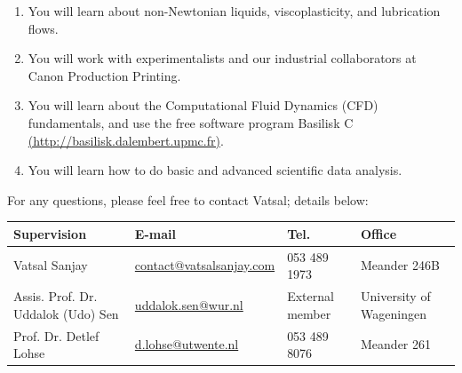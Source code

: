 \documentclass[a4paper,10pt]{article}
\begin{document}
\begin{enumerate}
\item You will learn about non-Newtonian liquids, viscoplasticity, and lubrication flows. 
\item You will work with experimentalists and our industrial collaborators at Canon Production Printing. 
\item You will learn about the Computational Fluid Dynamics (CFD) fundamentals, and use the free software program Basilisk C \href{http://basilisk.dalembert.upmc.fr}{(http://basilisk.dalembert.upmc.fr)}.
\item You will learn how to do basic and advanced scientific data analysis.
\end{enumerate}
For any questions, please feel free to contact Vatsal; details below: 

\begin{center}
\begin{tabular}{|l|l|l|l|}
\hline \textbf{Supervision} & \textbf{E-mail} & \textbf{Tel.} & \textbf{Office} \\ 
\hline Vatsal Sanjay & \href{mailto:contact@vatsalsanjay.com}{contact@vatsalsanjay.com} & 053 489 1973 & Meander 246B \\ 
\hline Assis. Prof. Dr. Uddalok (Udo) Sen & \href{mailto:uddalok.sen@wur.nl }{uddalok.sen@wur.nl} & External member & University of Wageningen \\ 
\hline Prof. Dr. Detlef Lohse & \href{mailto:d.lohse@utwente.nl}{d.lohse@utwente.nl} & 053 489 8076 & Meander 261 \\ 
\hline 
\end{tabular} 
\end{center}



\end{document}
